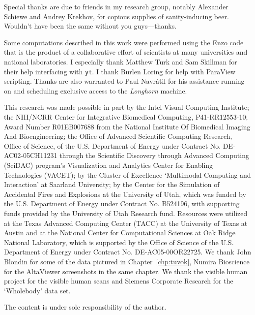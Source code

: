 Special thanks are due to friends in my research group, notably
Alexander Schiewe and Andrey Krekhov, for copious supplies of
sanity-inducing beer.  Wouldn't have been the same without you
guys---thanks.

Some computations described in this work were performed using the
\href{http://enzo-project.org}{Enzo code} that is the product of a
collaborative effort of scientists at many universities and national
laboratories.  I especially thank Matthew Turk and Sam Skillman for
their help interfacing with \texttt{yt}.  I thank Burlen Loring for
help with ParaView scripting.  Thanks are also warranted to Paul
Navr\'{a}til for his assistance running on and scheduling exclusive
access to the
\textit{Longhorn} machine.

This research was made possible in part by the Intel Visual
Computing Institute; the NIH/NCRR Center for Integrative Biomedical
Computing, P41-RR12553-10; Award Number R01EB007688 from the National
Institute Of Biomedical Imaging And Bioengineering; the Office of
Advanced Scientific Computing Research, Office of Science, of the
U.S. Department of Energy under Contract No. DE-AC02-05CH11231
through the Scientific Discovery through Advanced Computing (SciDAC)
program's Visualization and Analytics Center for Enabling Technologies
(VACET); by the Cluster of Excellence `Multimodal Computing and
Interaction' at Saarland University; by the Center for the Simulation
of Accidental Fires and Explosions at the University of Utah, which was
funded by the U.S. Department of Energy under Contract No. B524196,
with supporting funds provided by the University of Utah Research
fund. Resources were utilized at the Texas Advanced Computing Center
(TACC) at the University of Texas at Austin and at the National Center
for Computational Sciences at Oak Ridge National Laboratory, which is
supported by the Office of Science of the U.S. Department of Energy
under Contract No. DE-AC05-00OR22725.  We thank John Blondin for some
of the
data pictured in Chapter~\ref{chp:tuvok}, Numira Bioscience for the
AltaViewer screenshots in the same chapter.  We thank the visible human
project for the visible human scans and Siemens Corporate Research for
the `Wholebody' data set.

The content is under sole responsibility of the author.
